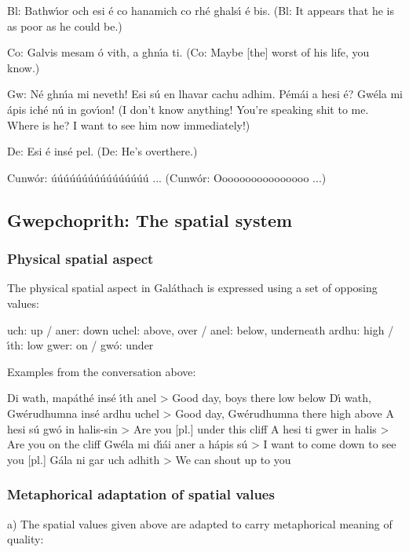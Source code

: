 Bl: Bathw\'{\i}or och esi \'{e} co hanamich co rh\'{e} ghals\'{\i} \'{e} bis.
(Bl: It appears that he is as poor as he could be.)

Co: Galvis mesam \'{o} vith, a ghn\'{\i}a ti.
(Co: Maybe [the] worst of his life, you know.)

Gw: N\'{e} ghn\'{\i}a mi neveth! Esi s\'{u} en lhavar cachu adhim. P\'{e}m\'{a}i a hesi \'{e}? Gw\'{e}la mi \'{a}pis ich\'{e} n\'{u} in gov\'{\i}on!
(I don't know anything! You’re speaking shit to me. Where is he? I want to see him now immediately!)

De: Esi \'{e} ins\'{e} pel.
(De: He’s overthere.)

Cunw\'{o}r: \'{u}\'{u}\'{u}\'{u}\'{u}\'{u}\'{u}\'{u}\'{u}\'{u}\'{u}\'{u}\'{u}\'{u}\'{u}\'{u} ...
(Cunw\'{o}r: Oooooooooooooooo ...)


\subsection{Gwepchoprith: The spatial system}
\subsubsection{Physical spatial aspect}

The physical spatial aspect in Gal\'{a}thach is expressed using a set of opposing values:

        uch: up                     / aner: down
        uchel: above, over    / anel: below, underneath
        ardhu: high              / \'{\i}th: low
        gwer: on                    / gw\'{o}: under

Examples from the conversation above:

Di wath, map\'{a}th\'{e} ins\'{e} \'{\i}th anel > Good day, boys there low below
D\'{\i} wath, Gw\'{e}rudhumna ins\'{e} ardhu uchel > Good day, Gw\'{e}rudhumna there high above 
A hesi s\'{u} gw\'{o} in halis-sin > Are you [pl.] under this cliff
A hesi ti gwer in halis > Are you on the cliff
Gw\'{e}la mi d\'{\i}\'{a}i aner a h\'{a}pis s\'{u} > I want to come down to see you [pl.]
G\'{a}la ni gar uch adhith > We can shout up to you


\subsubsection{Metaphorical adaptation of spatial values}

a) The spatial values given above are adapted to carry metaphorical meaning of quality:

